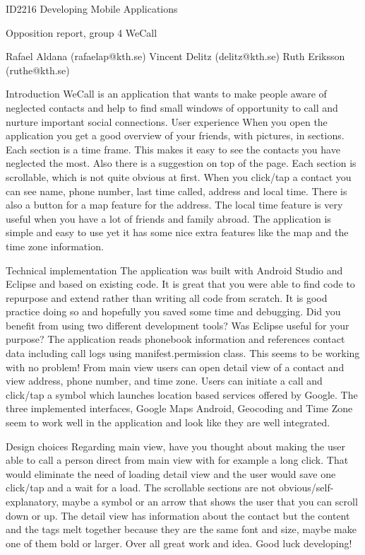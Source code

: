 ID2216 Developing Mobile Applications

Opposition report, group 4 WeCall

Rafael Aldana (rafaelap@kth.se)
Vincent Delitz (delitz@kth.se)
Ruth Eriksson (ruthe@kth.se)

Introduction
WeCall is an application that wants to make people aware of neglected contacts and help to find small windows of opportunity to call and nurture important social connections.
User experience
When you open the application you get a good overview of your friends, with pictures, in sections. Each section is a time frame. This makes it easy to see the contacts you have neglected the most. Also there is a suggestion on top of the page. Each section is scrollable, which is not quite obvious at first. When you click/tap a contact you can see name, phone number, last time called, address and local time. 
There is also a button for a map feature for the address. The local time feature is very useful when you have a lot of friends and family abroad. The application is simple and easy to use yet it has some nice extra features like the map and the time zone information.

Technical implementation
The application was built with Android Studio and Eclipse and based on existing code. It is great that you were able to find code to repurpose and extend rather than writing all code from scratch. It is good practice doing so and hopefully you saved some time and debugging. 
Did you benefit from using two different development tools? Was Eclipse useful for your purpose?
The application reads phonebook information and references contact data including call logs using manifest.permission class. This seems to be working with no problem!
From main view users can open detail view of a contact and view address, phone number, and time zone. Users can initiate a call and click/tap a symbol which launches location based services offered by Google. The three implemented interfaces, Google Maps Android, Geocoding and Time Zone seem to work well in the application and look like they are well integrated. 

Design choices
Regarding main view, have you thought about making the user able to call a person direct from main view with for example a long click. That would eliminate the need of loading detail view and the user would save one click/tap and a wait for a load. The scrollable sections are not obvious/self-explanatory, maybe a symbol or an arrow that shows the user that you can scroll down or up.
The detail view has information about the contact but the content and the tags melt together because they are the same font and size, maybe make one of them bold or larger.
Over all great work and idea. Good luck developing!
